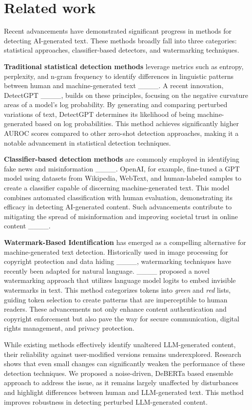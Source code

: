 \section{Related work}
Recent advancements have demonstrated significant progress in methods for detecting AI-generated text. These methods broadly fall into three categories: statistical approaches, classifier-based detectors, and watermarking techniques.

\textbf{Traditional statistical detection methods} leverage metrics such as entropy, perplexity, and n-gram frequency to identify differences in linguistic patterns between human and machine-generated text ____. A recent innovation, DetectGPT ____, builds on these principles, focusing on the negative curvature areas of a model's log probability. By generating and comparing perturbed variations of text, DetectGPT determines its likelihood of being machine-generated based on log probabilities. This method achieves significantly higher AUROC scores compared to other zero-shot detection approaches, making it a notable advancement in statistical detection techniques.

\textbf{Classifier-based detection methods} are commonly employed in identifying fake news and misinformation ____. OpenAI, for example, fine-tuned a GPT model using datasets from Wikipedia, WebText, and human-labeled samples to create a classifier capable of discerning machine-generated text. This model combines automated classification with human evaluation, demonstrating its efficacy in detecting AI-generated content. Such advancements contribute to mitigating the spread of misinformation and improving societal trust in online content ____.

\textbf{Watermark-Based Identification} has emerged as a compelling alternative for machine-generated text detection. Historically used in image processing for copyright protection and data hiding ____, watermarking techniques have recently been adapted for natural language. ____ proposed a novel watermarking approach that utilizes language model logits to embed invisible watermarks in text. This method categorizes tokens into \textit{green} and \textit{red} lists, guiding token selection to create patterns that are imperceptible to human readers. These advancements not only enhance content authentication and copyright enforcement but also pave the way for secure communication, digital rights management, and privacy protection.

While existing methods effectively identify unaltered LLM-generated content, their reliability against user-modified versions remains underexplored. Research shows that even small changes can significantly weaken the performance of these detection techniques. We proposed a noise-driven, DeBERTa based ensemble approach to address the issue, as it remains largely unaffected by disturbances and highlight differences between human and LLM-generated text. This method improves robustness in detecting perturbed LLM-generated content.

